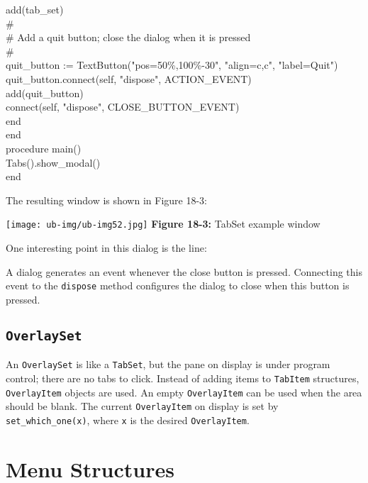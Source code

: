 {\>\>add(tab\_set) \\
\>\>\# \\
\>\>\# Add a quit button; close the dialog when it is pressed \\
\>\>\# \\
\>\>quit\_button := TextButton("pos=50\%,100\%-30", "align=c,c", "label=Quit") \\
\>\>quit\_button.connect(self, "dispose", ACTION\_EVENT) \\
\>\>add(quit\_button) \\
\>\>connect(self, "dispose", CLOSE\_BUTTON\_EVENT) \\
\>end \\
end \\
procedure main() \\
\>Tabs().show\_modal() \\
end
}


The resulting window is shown in Figure 18-3:

\begin{center}
\texttt{[image: ub-img/ub-img52.jpg]}
\linebreak
{\sffamily\bfseries Figure 18-3:}
{\sffamily TabSet example window}
\end{center}

\bigskip

\noindent One interesting point in this dialog is the line:



\noindent A dialog generates an event whenever the close button is
pressed. Connecting this event to the \texttt{dispose}
method configures the dialog to close when this button is
pressed.

\subsection*{\texttt{OverlaySet}}

An \texttt{OverlaySet} is like a \texttt{TabSet},
but the pane on display is under program control; there are no
tabs to click. Instead of adding items to \texttt{TabItem} structures,
\texttt{OverlayItem} objects are used. An empty \texttt{OverlayItem} can be
used when the area should be blank. The current \texttt{OverlayItem} on
display is set by \texttt{set\_which\_one(x)}, where \texttt{x} is
the desired \texttt{OverlayItem}.

\section{Menu Structures}

